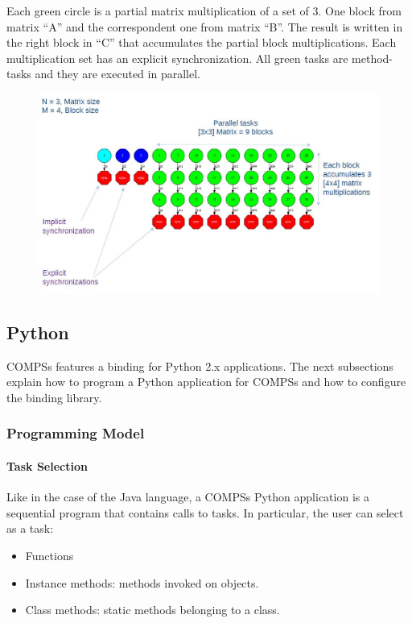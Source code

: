 Each green circle is a partial matrix multiplication of a set of 3. One block from matrix ``A'' and the 
correspondent one from matrix ``B''. The result is written in the right block in ``C'' that accumulates 
the partial block multiplications. Each multiplication set has an explicit synchronization. 
All green tasks are method-tasks and they are executed in parallel.

\begin{figure}[ht!]
  \centering
    \includegraphics[width=1.0\textwidth]{./Sections/6_Bindings/Figures/matmul.jpeg}
\end{figure}

\subsection{Python}

COMPSs features a binding for Python 2.x applications. The next subsections explain how to program a Python 
application for COMPSs and how to configure the binding library.

\subsubsection{Programming Model}

\paragraph{Task Selection}

Like in the case of the Java language, a COMPSs Python application is a sequential program that contains calls 
to tasks. In particular, the user can select as a task:

\begin{itemize}
 \item Functions
 \item Instance methods: methods invoked on objects.
 \item Class methods: static methods belonging to a class.
\end{itemize}

